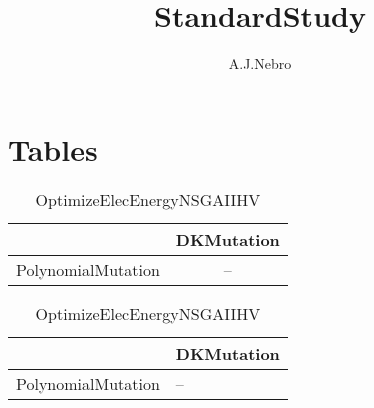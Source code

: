 \documentclass{article}
\title{StandardStudy}
\author{A.J.Nebro}
\begin{document}
\maketitle
\section{Tables}

\begin{table}
\caption{OptimizeElecEnergyNSGAIIHV}
\label{Table:OptimizeElecEnergyNSGAIIHV}
\centering
\begin{scriptsize}
\begin{tabular}{lc}
\hline  & DKMutation\\ 
\hline 
PolynomialMutation
 & 
--
 \\ 
\hline
\end{tabular}
\end{scriptsize}
\end{table}
\begin{table}
\caption{OptimizeElecEnergyNSGAIIHV}
\label{Table:OptimizeElecEnergyNSGAIIHV}
\centering
\begin{scriptsize}
\begin{tabular}{
| l | p{0.15cm}   | 
}
\hline \multicolumn{1}{|c|}{} & \multicolumn{1}{c|}{DKMutation} \\
\hline 
PolynomialMutation
 & 
--
 \\ 
\hline
\end{tabular}
\end{scriptsize}
\end{table}
\end{document}
